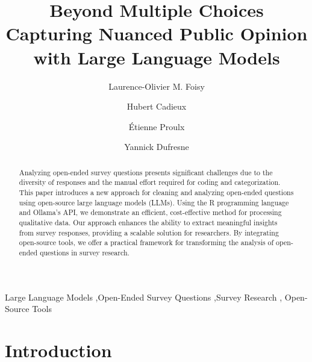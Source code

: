 \documentclass[
  authoryear,
  preprint,
  3p]{elsarticle}
\begin{document}
\begin{frontmatter}
\title{Beyond Multiple Choices \\\large{Capturing Nuanced Public Opinion
with Large Language Models} }
\author[1]{Laurence-Olivier M. Foisy%
%
}
\author[1]{Hubert Cadieux%
%
}
\author[1]{Étienne Proulx%
%
}
\author[1]{Yannick Dufresne%
%
}






        
\begin{abstract}
Analyzing open-ended survey questions presents significant challenges
due to the diversity of responses and the manual effort required for
coding and categorization. This paper introduces a new approach for
cleaning and analyzing open-ended questions using open-source large
language models (LLMs). Using the R programming language and Ollama's
API, we demonstrate an efficient, cost-effective method for processing
qualitative data. Our approach enhances the ability to extract
meaningful insights from survey responses, providing a scalable solution
for researchers. By integrating open-source tools, we offer a practical
framework for transforming the analysis of open-ended questions in
survey research.
\end{abstract}





\begin{keyword}
    Large Language Models \sep Open-Ended Survey Questions \sep Survey
Research \sep 
    Open-Source Tools
\end{keyword}
\end{frontmatter}
    
\section{Introduction}\label{introduction}
\end{document}
